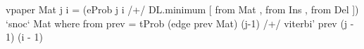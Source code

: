 vpaper Mat j i = (eProb j i /+/ DL.minimum [ from Mat
                                        , from Ins
                                        , from Del
                                        ]) `snoc` Mat
  where from prev = tProb (edge prev Mat) (j-1) /+/
                      viterbi' prev (j - 1) (i - 1)
